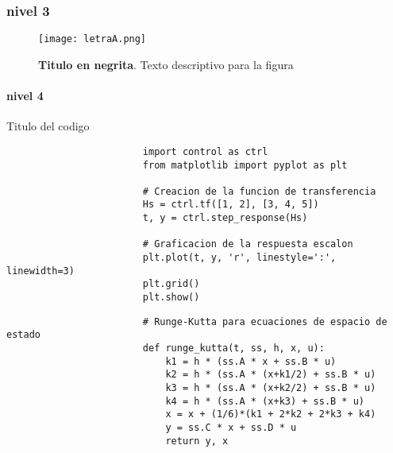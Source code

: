 		\subsubsection{nivel 3}
			
			\Blindtext

			\blindtext
			
			\begin{figure}[htb]
				\centering
				\texttt{[image: letraA.png]} %
				\caption[Titulo de la figura, este texto saldra en la lista de figuras]{\textbf{Titulo en negrita}. Texto descriptivo para la figura} 
				\label{fig:letraA}
			\end{figure}

			\paragraph{nivel 4}

				\blindtext

				\begin{longlisting}
					\caption{Titulo del codigo}
					\label{code:1}				
					\begin{verbatim}
						import control as ctrl
						from matplotlib import pyplot as plt
						
						# Creacion de la funcion de transferencia
						Hs = ctrl.tf([1, 2], [3, 4, 5])
						t, y = ctrl.step_response(Hs)
						
						# Graficacion de la respuesta escalon
						plt.plot(t, y, 'r', linestyle=':', linewidth=3)
						plt.grid()
						plt.show()
					\end{verbatim}
				\end{longlisting}

				\blindtext

				\begin{longlisting}				
					\begin{verbatim}
						# Runge-Kutta para ecuaciones de espacio de estado
						def runge_kutta(t, ss, h, x, u):
							k1 = h * (ss.A * x + ss.B * u)
							k2 = h * (ss.A * (x+k1/2) + ss.B * u)
							k3 = h * (ss.A * (x+k2/2) + ss.B * u)
							k4 = h * (ss.A * (x+k3) + ss.B * u)
							x = x + (1/6)*(k1 + 2*k2 + 2*k3 + k4)
							y = ss.C * x + ss.D * u
							return y, x
					\end{verbatim}
				\end{longlisting}

				\blindtext
	
		
			